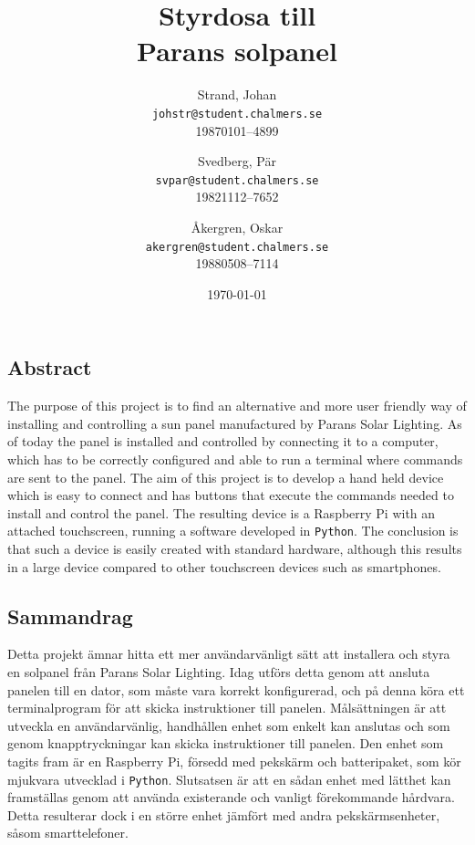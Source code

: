 \documentclass{article}
\author{    Strand, Johan \\ \texttt{johstr@student.chalmers.se} \\ 
            19870101--4899 \and
            Svedberg, Pär\\ \texttt{svpar@student.chalmers.se}  \\ 
            19821112--7652 \and
            Åkergren, Oskar\\ \texttt{akergren@student.chalmers.se}  \\ 19880508--7114
}
\title{\vspace{2cm} Styrdosa till \\ Parans solpanel  \vspace{1cm}}
\date{\vspace{8cm}\today}
\begin{document}
    \maketitle
    \thispagestyle{empty}

    \newpage 
    
    \setcounter{page}{1}

    \subsection*{Abstract} %
    \label{sub:abstract}
            The purpose of this project is to find an alternative and more 
            user friendly way of installing and controlling a sun panel 
            manufactured by Parans Solar Lighting. As of today the panel is 
            installed and controlled by connecting it to a computer, 
            which has to be correctly configured and able to run a terminal 
            where commands are sent to the panel. The aim of this project is 
            to develop a hand held device which is easy to connect and has 
            buttons that execute the commands needed to install and control 
            the panel. The resulting device is a Raspberry Pi with an attached
            touchscreen, running a software developed in \texttt{Python}.  
            The conclusion is that such a device is easily created with standard
            hardware, although this results in a large device 
            compared to other touchscreen devices such as smartphones.
            
    \subsection*{Sammandrag} %
    \label{sub:sammandrag}
            Detta projekt ämnar hitta ett mer användarvänligt sätt att
            installera och styra en solpanel från Parans Solar Lighting. Idag
            utförs detta genom att ansluta panelen till en dator, som måste vara
            korrekt konfigurerad, och på denna köra ett terminalprogram för att
            skicka instruktioner till panelen. Målsättningen är att utveckla en
            användarvänlig, handhållen enhet som enkelt kan anslutas och som
            genom knapptryckningar kan skicka instruktioner till panelen. Den
            enhet som tagits fram är en Raspberry Pi, försedd med pekskärm och
            batteripaket, som kör mjukvara utvecklad i \texttt{Python}.
            Slutsatsen är att en sådan enhet med lätthet kan framställas genom
            att använda existerande och vanligt förekommande hårdvara. Detta
            resulterar dock i en större enhet jämfört med andra
            pekskärmsenheter, såsom smarttelefoner.
\end{document}
